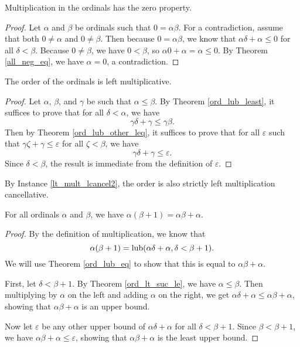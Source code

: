 \documentclass[../../math.tex]{subfiles}
\begin{document}
\begin{instance}
    Multiplication in the ordinals has the zero property.
\end{instance}
\begin{proof}
    Let $\alpha$ and $\beta$ be ordinals such that $0 = \alpha \beta$.  For a
    contradiction, assume that both $0 \neq \alpha$ and $0 \neq \beta$.  Then
    because $0 = \alpha \beta$, we know that $\alpha \delta + \alpha \leq 0$ for
    all $\delta < \beta$.  Because $0 \neq \beta$, we have $0 < \beta$, so
    $\alpha 0 + \alpha = \alpha \leq 0$.  By Theorem \ref{all_neg_eq}, we have
    $\alpha = 0$, a contradiction.
\end{proof}

\begin{instance}
    The order of the ordinals is left multiplicative.
\end{instance}
\begin{proof}
    Let $\alpha$, $\beta$, and $\gamma$ be such that $\alpha \leq \beta$.  By
    Theorem \ref{ord_lub_least}, it suffices to prove that for all $\delta <
    \alpha$, we have
    \[
        \gamma \delta + \gamma \leq \gamma \beta.
    \]
    Then by Theorem \ref{ord_lub_other_leq}, it suffices to prove that for all
    $\varepsilon$ such that $\gamma \zeta + \gamma \leq \varepsilon$ for all
    $\zeta < \beta$, we have
    \[
        \gamma\delta + \gamma \leq \varepsilon.
    \]
    Since $\delta < \beta$, the result is immediate from the definition of
    $\varepsilon$.
\end{proof}

By Instance \ref{lt_mult_lcancel2}, the order is also strictly left
multiplication cancellative.

\begin{theorem} \label{ord_ldist_one}
    For all ordinals $\alpha$ and $\beta$, we have $\alpha(\beta + 1) =
    \alpha\beta + \alpha$.
\end{theorem}
\begin{proof}
    By the definition of multiplication, we know that
    \[
        \alpha(\beta + 1) = \operatorname{lub}(\alpha\delta + \alpha, \delta < \beta + 1).
    \]
    We will use Theorem \ref{ord_lub_eq} to show that this is equal to $\alpha
    \beta + \alpha$.

    First, let $\delta < \beta + 1$.  By Theorem \ref{ord_lt_suc_le}, we have
    $\alpha \leq \beta$.  Then multiplying by $\alpha$ on the left and adding
    $\alpha$ on the right, we get $\alpha\delta + \alpha \leq \alpha \beta +
    \alpha$, showing that $\alpha\beta + \alpha$ is an upper bound.

    Now let $\varepsilon$ be any other upper bound of $\alpha \delta + \alpha$
    for all $\delta < \beta + 1$.  Since $\beta < \beta + 1$, we have $\alpha
    \beta + \alpha \leq \varepsilon$, showing that $\alpha \beta + \alpha$ is
    the least upper bound.
\end{proof}
\end{document}
